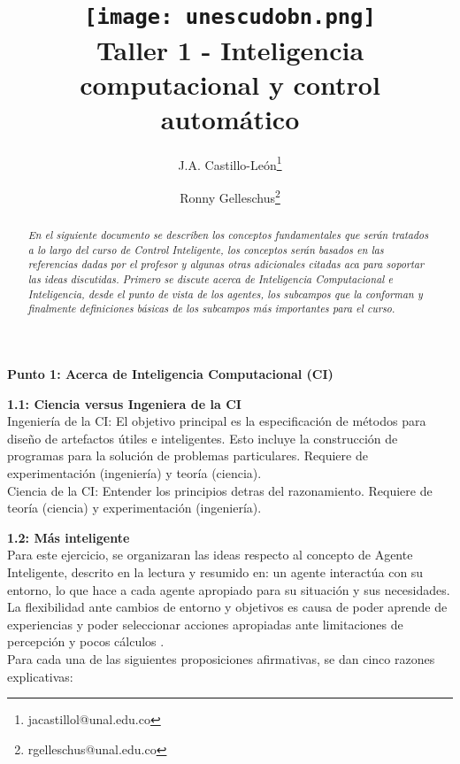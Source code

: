 \documentclass[10pt,onecolumn,twoside,letterpaper]{article}
\title{\vspace{-0.8cm}\texttt{[image: unescudobn.png]}\\\vspace{-0.0cm}
  \LARGE \textbf{Taller 1 - Inteligencia computacional y control autom\'atico}}
\author{J.A. Castillo-Le\'on\thanks{jacastillol@unal.edu.co} \and Ronny Gelleschus\thanks{rgelleschus@unal.edu.co}}
\date{}
\begin{document}
\maketitle
\begin{abstract}\noindent\small\textit{En el siguiente documento se describen los conceptos fundamentales que ser\'an tratados a lo largo del curso de Control Inteligente, los conceptos ser\'an basados en las referencias dadas por el profesor y algunas otras adicionales citadas aca para soportar las ideas discutidas. Primero se discute acerca de Inteligencia Computacional e Inteligencia, desde el punto de vista de los agentes, los subcampos que la conforman y finalmente definiciones b\'asicas de los subcampos m\'as importantes para el curso.}
\end{abstract}\vspace{1cm}
\par{\bf \large Punto 1: Acerca de Inteligencia Computacional (CI)}\\
\par{\bf 1.1: Ciencia versus Ingeniera de la CI}\\
Ingenier\'ia de la CI: El objetivo principal es la especificaci\'on de m\'etodos para dise\~no de artefactos \'utiles e inteligentes. Esto incluye la construcci\'on de programas para la soluci\'on de problemas particulares. Requiere de experimentaci\'on (ingenier\'ia) y teor\'ia (ciencia).\\
Ciencia de la CI: Entender los principios detras del razonamiento. Requiere de teor\'ia (ciencia) y experimentaci\'on (ingenier\'ia). 
\par{\bf 1.2: M\'as inteligente}\\
Para este ejercicio, se organizaran las ideas respecto al concepto de Agente Inteligente, descrito en la lectura y resumido en: un agente interact\'ua con su entorno, lo que hace a cada agente apropiado para su situaci\'on y sus necesidades. La flexibilidad ante cambios de entorno y objetivos es causa de poder aprende de experiencias y poder seleccionar acciones apropiadas ante limitaciones de percepci\'on y pocos c\'alculos \cite{book:Poole}.\\
Para cada una de las siguientes proposiciones afirmativas, se dan cinco razones explicativas:
\end{document}
